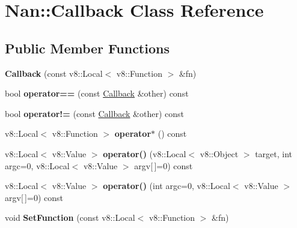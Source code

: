 \hypertarget{class_nan_1_1_callback}{}\section{Nan\+:\+:Callback Class Reference}
\label{class_nan_1_1_callback}
\subsection*{Public Member Functions}
\begin{DoxyCompactItemize}
\item 
\mbox{\label{class_nan_1_1_callback_ae9897ab97c4ade036795fe1c5238d35f}} 
{\bfseries Callback} (const v8\+::\+Local$<$ v8\+::\+Function $>$ \&fn)
\item 
\mbox{\label{class_nan_1_1_callback_aba26e5b32850ab13670876fbfaf56bc1}} 
bool {\bfseries operator==} (const \hyperlink{class_nan_1_1_callback}{Callback} \&other) const
\item 
\mbox{\label{class_nan_1_1_callback_ab544a9391d21b5194b7207869690f9db}} 
bool {\bfseries operator!=} (const \hyperlink{class_nan_1_1_callback}{Callback} \&other) const
\item 
\mbox{\label{class_nan_1_1_callback_af2f3faab04153f164834047efd6de952}} 
v8\+::\+Local$<$ v8\+::\+Function $>$ {\bfseries operator$\ast$} () const
\item 
\mbox{\label{class_nan_1_1_callback_ab85ec70795268cf61eb5c84285f7ff63}} 
v8\+::\+Local$<$ v8\+::\+Value $>$ {\bfseries operator()} (v8\+::\+Local$<$ v8\+::\+Object $>$ target, int argc=0, v8\+::\+Local$<$ v8\+::\+Value $>$ argv\mbox{[}$\,$\mbox{]}=0) const
\item 
\mbox{\label{class_nan_1_1_callback_aac0cab9f13ab03e25704e657167f2e2d}} 
v8\+::\+Local$<$ v8\+::\+Value $>$ {\bfseries operator()} (int argc=0, v8\+::\+Local$<$ v8\+::\+Value $>$ argv\mbox{[}$\,$\mbox{]}=0) const
\item 
\mbox{\label{class_nan_1_1_callback_a740f23b3ade123441982c1c8732dda47}} 
void {\bfseries Set\+Function} (const v8\+::\+Local$<$ v8\+::\+Function $>$ \&fn)

\end{DoxyCompactItemize}
